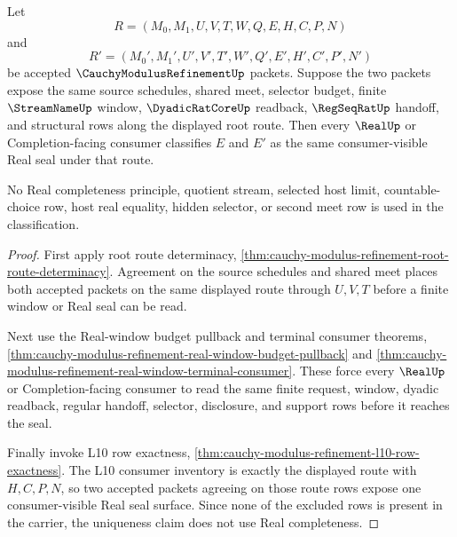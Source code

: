 \begin{theorem}
\label{thm:cauchy-modulus-refinement-root-window-selector-uniqueness}
Let
$$
R=(M_0,M_1,U,V,T,W,Q,E,H,C,P,N)
$$
and
$$
R'=(M_0',M_1',U',V',T',W',Q',E',H',C',P',N')
$$
be accepted $\CauchyModulusRefinementUp$ packets. Suppose the two packets expose the same source schedules, shared meet, selector budget, finite $\StreamNameUp$ window, $\DyadicRatCoreUp$ readback, $\RegSeqRatUp$ handoff, and structural rows along the displayed root route. Then every $\RealUp$ or Completion-facing consumer classifies $E$ and $E'$ as the same consumer-visible Real seal under that route.

No Real completeness principle, quotient stream, selected host limit, countable-choice row, host real equality, hidden selector, or second meet row is used in the classification.
\end{theorem}
\begin{proof}
First apply root route determinacy, \autoref{thm:cauchy-modulus-refinement-root-route-determinacy}. Agreement on the source schedules and shared meet places both accepted packets on the same displayed route through $U,V,T$ before a finite window or Real seal can be read.

Next use the Real-window budget pullback and terminal consumer theorems, \autoref{thm:cauchy-modulus-refinement-real-window-budget-pullback} and \autoref{thm:cauchy-modulus-refinement-real-window-terminal-consumer}. These force every $\RealUp$ or Completion-facing consumer to read the same finite request, window, dyadic readback, regular handoff, selector, disclosure, and support rows before it reaches the seal.

Finally invoke L10 row exactness, \autoref{thm:cauchy-modulus-refinement-l10-row-exactness}. The L10 consumer inventory is exactly the displayed route with $H,C,P,N$, so two accepted packets agreeing on those route rows expose one consumer-visible Real seal surface. Since none of the excluded rows is present in the carrier, the uniqueness claim does not use Real completeness.
\end{proof}

